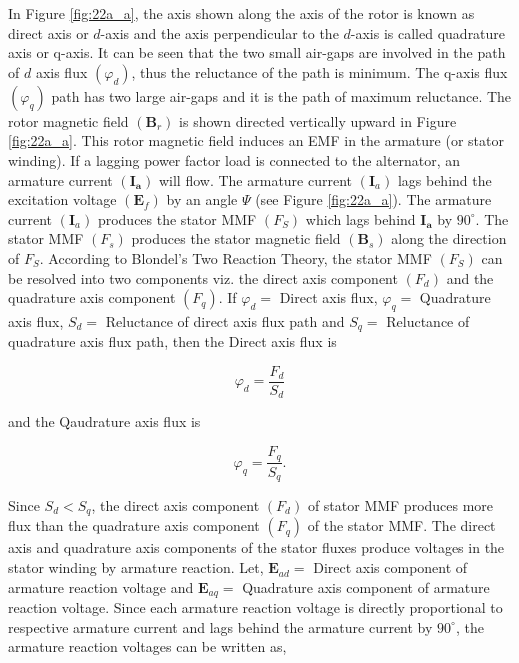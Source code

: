 \documentclass[main.tex]{subfiles}
\begin{document}
\begin{enumerate}
In Figure \ref{fig:22a_a}, the axis shown along the axis of the rotor is known as direct axis or $d$-axis and the axis perpendicular to the $d$-axis is called quadrature axis or q-axis. It can be seen that the two small air-gaps are involved in the path of $d$ axis flux $\left(\varphi_d\right)$, thus the reluctance of the path is minimum. The q-axis flux $\left(\varphi_q\right)$ path has two large air-gaps and it is the path of maximum reluctance. The rotor magnetic field $\left(\boldsymbol{B}_r\right)$ is shown directed vertically upward in Figure \ref{fig:22a_a}. This rotor magnetic field induces an EMF in the armature (or stator winding). If a lagging power factor load is connected to the alternator, an armature current $\left(\boldsymbol{I}_{\boldsymbol{a}}\right)$ will flow. The armature current $\left(\boldsymbol{I}_a\right)$ lags behind the excitation voltage $\left(\boldsymbol{E}_f\right)$ by an angle $\Psi$ (see Figure \ref{fig:22a_a}). The armature current $\left(\boldsymbol{I}_a\right)$ produces the stator MMF $\left(F_S\right)$ which lags behind $\boldsymbol{I}_{\boldsymbol{a}}$ by $90^{\circ}$. The stator MMF $\left(F_s\right)$ produces the stator magnetic field $\left(\boldsymbol{B}_s\right)$ along the direction of $F_S$. According to Blondel's Two Reaction Theory, the stator MMF $\left(F_S\right)$ can be resolved into two components viz. the direct axis component $\left(F_d\right)$ and the quadrature axis component $\left(F_q\right)$. If $\varphi_d=$ Direct axis flux, $\varphi_q=$ Quadrature axis flux, $S_d=$ Reluctance of direct axis flux path and $S_q=$ Reluctance of quadrature axis flux path, then the Direct axis flux is

$$
\varphi_d=\frac{F_d}{S_d}
$$

and the Qaudrature axis flux is

$$
\varphi_q=\frac{F_q}{S_q}.
$$

Since $S_d<S_q$, the direct axis component $\left(F_d\right)$ of stator MMF produces more flux than the quadrature axis component $\left(F_q\right)$ of the stator MMF. The direct axis and quadrature axis components of the stator fluxes produce voltages in the stator winding by armature reaction. Let, $\boldsymbol{E}_{a d}=$ Direct axis component of armature reaction voltage and $\boldsymbol{E}_{a q}=$ Quadrature axis component of armature reaction voltage. Since each armature reaction voltage is directly proportional to respective armature current and lags behind the armature current by $90^{\circ}$, the armature reaction voltages can be written as,


\end{enumerate}
\end{document}
